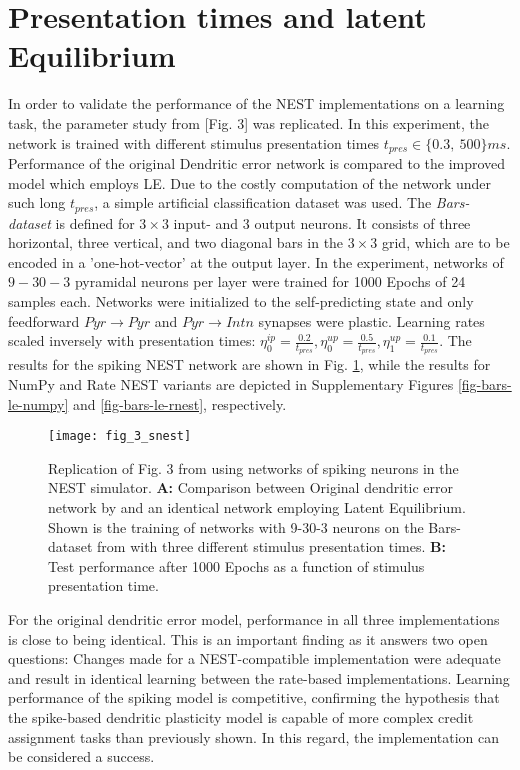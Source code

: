 \section{Presentation times and latent Equilibrium}\label{sec-le-tpres}

In order to validate the performance of the NEST implementations on a learning task, the parameter study from
\citep{Haider2021}[Fig. 3] was replicated. In this experiment, the network is trained with different stimulus
presentation times $t_{pres} \in \{0.3,\ 500\}ms$. Performance of the original Dendritic error network is compared to
the improved model which employs LE. Due to the costly computation of the network under such long $t_{pres}$, a simple
artificial classification dataset was used. The \textit{Bars-dataset} is defined for $3\times3$ input- and $3$ output
neurons. It consists of three horizontal, three vertical, and two diagonal bars in the $3\times3$ grid, which are to be
encoded in a 'one-hot-vector' at the output layer. In the experiment, networks of $9-30-3$ pyramidal neurons per layer
were trained for 1000 Epochs of 24 samples each. Networks were initialized to the self-predicting state and only
feedforward $Pyr\rightarrow Pyr$ and $Pyr \rightarrow Intn$ synapses were plastic. Learning rates scaled inversely with
presentation times: $\eta^{ip}_0 = \frac{0.2}{t_{pres}}, \eta^{up}_0 = \frac{0.5}{t_{pres}}, \eta^{up}_1 =
    \frac{0.1}{t_{pres}}$. The results for the spiking NEST network are shown in Fig. \ref{fig-bars-le-snest}, while the
results for NumPy and Rate NEST variants are depicted in Supplementary Figures \ref{fig-bars-le-numpy} and
\ref{fig-bars-le-rnest}, respectively.


\begin{figure}[h]
    \centering
    \texttt{[image: fig\_3\_snest]}
    \caption[Replication of Fig. 3 from \citep{Haider2021}.]{Replication of Fig. 3 from \citep{Haider2021} using
        networks of spiking neurons in the NEST simulator. \textbf{A:} Comparison between Original dendritic error
        network by and an identical network employing Latent Equilibrium. Shown is the training of networks with 9-30-3
        neurons on the Bars-dataset from with three different stimulus presentation times. \textbf{B:} Test performance
        after 1000 Epochs as a function of stimulus presentation time.}
    \label{fig-bars-le-snest}
\end{figure}

For the original dendritic error model, performance in all three implementations is close to being identical. This is an
important finding as it answers two open questions: Changes made for a NEST-compatible implementation were adequate and
result in identical learning between the rate-based implementations. Learning performance of the spiking model is
competitive, confirming the hypothesis that the spike-based dendritic plasticity model is capable of more complex credit
assignment tasks than previously shown. In this regard, the implementation can be considered a success.

